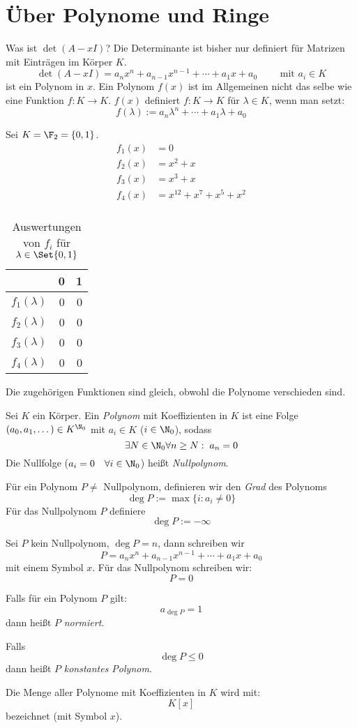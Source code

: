 \documentclass{mycourse}
\begin{document}
\section{Über Polynome und Ringe}

Was ist $\det(A-xI)$?
Die Determinante ist bisher nur definiert für Matrizen mit Einträgen im Körper $K$.
\[
\det(A-xI)=a_nx^n+a_{n-1}x^{n-1}+\dotsb+a_1x+a_0 \qquad \text{ mit }a_i \in K
\]
ist ein Polynom in $x$.
Ein Polynom $f(x)$ ist im Allgemeinen nicht das selbe wie eine Funktion $f:K\to K$.
$f(x)$ definiert $f:K\to K$ für $\lambda\in K$, wenn man setzt:
\[
f(\lambda):= a_n\lambda^n+\dotsb+a_1\lambda+a_0
\]

\begin{ex}
Sei $K=\F_2=\{0,1\}$.
\begin{align*}
f_1(x)&=0\\
f_2(x)&=x^2+x\\
f_3(x)&=x^3+x\\
f_4(x)&=x^{12}+x^{7}+x^5+x^2\\
\end{align*}
\begin{table}[ht]
	\centering
\begin{tabular}{l|r|r}
 & 0 & 1\\
\hline
$f_1(\lambda)$ & 0 & 0\\
$f_2(\lambda)$ & 0 & 0\\
$f_3(\lambda)$ & 0 & 0\\
$f_4(\lambda)$ & 0 & 0
\end{tabular}
\caption{Auswertungen von $f_i$ für $\lambda \in \Set{0,1}$}
\end{table}

Die zugehörigen Funktionen sind gleich, obwohl die Polynome verschieden sind.
\end{ex}

\begin{df}
\label{df:10.6}
Sei $K$ ein Körper.
Ein \emph{Polynom} mit Koeffizienten in $K$ ist eine Folge $(a_0, a_1, \dotsc)\in K^{\N_0}$ mit
$a_i\in K$ ($i\in \N_0$), sodass
\[
\exists N\in \N_0 \forall n\ge N:\; a_n=0
\]
Die Nullfolge ($a_i=0 \quad\forall i\in\N_0$) heißt \emph{Nullpolynom}.

Für ein Polynom $P\neq$ Nullpolynom, definieren wir den \emph{Grad} des Polynoms
\[
\deg P:= \max\{i:a_i\neq 0\}
\]
Für das Nullpolynom $P$ definiere
\[
\deg P:= -\infty
\]

Sei $P$ kein Nullpolynom, $\deg P=n$, dann schreiben wir
\[
P=a_nx^n + a_{n-1}x^{n-1} + \dotsb + a_1x + a_0
\]
mit einem Symbol $x$.
Für das Nullpolynom schreiben wir:
\[
P=0
\]

Falls für ein Polynom $P$ gilt:
\[
a_{\deg P}=1
\]
dann heißt $P$ \emph{normiert}.

Falls
\[
\deg P\le 0
\]
dann heißt $P$ \emph{konstantes Polynom}.

Die Menge aller Polynome mit Koeffizienten in $K$ wird mit:
\[
K[x]
\]
bezeichnet (mit Symbol $x$).
\end{df}
\end{document}

